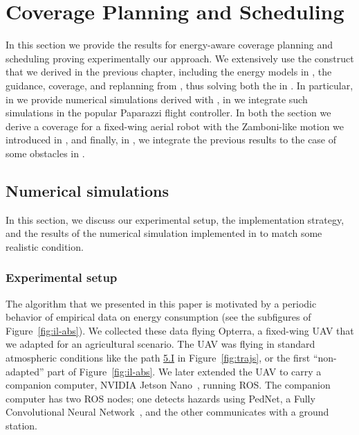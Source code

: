 \section{Coverage Planning and Scheduling}
\label{sec:res-dyn}
 
In this section we provide the results for energy-aware coverage planning and scheduling proving experimentally our approach. We extensively use the construct that we derived in the previous chapter, including the energy models in , the guidance, coverage, and replanning from , thus solving both the  in . In particular, in  we provide numerical simulations derived with \matlab, in  we integrate such simulations in the popular Paparazzi flight controller. In both the section we derive a coverage for a fixed-wing aerial robot with the Zamboni-like motion we introduced in , and finally, in , we integrate the previous results to the case of some obstacles in . 

\subsection{Numerical simulations}
\label{sec:res-num-simu}

In this section, we discuss our experimental setup, the implementation strategy, and the results of the numerical simulation implemented in \matlab to match some realistic condition.

\subsubsection*{Experimental setup}

The algorithm that we presented in this paper is motivated by a periodic behavior of empirical data on energy consumption (see the subfigures of Figure~\ref{fig:il-abs}). We collected these data flying Opterra, a fixed-wing UAV that we adapted for an agricultural scenario. The UAV was flying in standard atmospheric conditions like the path \hyperref[fig:trajs-I-static]{5.I} in Figure~\ref{fig:trajs}, or the first ``non-adapted'' part of Figure~\ref{fig:il-abs}. We later extended the UAV to carry a companion computer, NVIDIA Jetson Nano~\cite{nano}, running ROS. The companion computer has two ROS nodes; one detects hazards using PedNet, a Fully Convolutional Neural Network~\cite{ullah2018pednet}, and the other communicates with a ground station.


